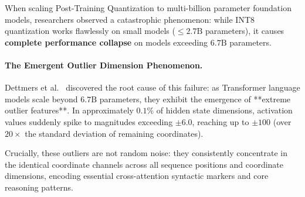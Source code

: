 \documentclass[../../../main.tex]{subfiles}
\begin{document}
When scaling Post-Training Quantization to multi-billion parameter foundation models, researchers observed a catastrophic phenomenon: while INT8 quantization works flawlessly on small models ($\le 2.7\text{B}$ parameters), it causes \textbf{complete performance collapse} on models exceeding $6.7\text{B}$ parameters.

\paragraph{The Emergent Outlier Dimension Phenomenon.}
Dettmers et al.~\citep{dettmers2022llmint8} discovered the root cause of this failure: as Transformer language models scale beyond $6.7\text{B}$ parameters, they exhibit the emergence of **extreme outlier features**. In approximately $0.1\%$ of hidden state dimensions, activation values suddenly spike to magnitudes exceeding $\pm 6.0$, reaching up to $\pm 100$ (over $20\times$ the standard deviation of remaining coordinates). 

Crucially, these outliers are not random noise: they consistently concentrate in the identical coordinate channels across all sequence positions and coordinate dimensions, encoding essential cross-attention syntactic markers and core reasoning patterns.
\end{document}
